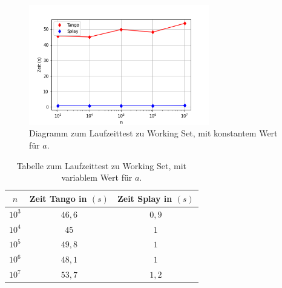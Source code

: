 \documentclass[a4paper,12pt]{article}
\begin{document}
\begin{figure}[H]
	\centering
	\includegraphics[width=0.7\textwidth]{Medien/laufzeittest/diagramm/workingset}
	\caption{Diagramm zum Laufzeittest zu Working Set, mit konstantem Wert für $a$.}
\end{figure}
\begin{table}[H]
	\begin{center}
		\begin{tabular}[c]{|c|c|c|}
			\hline
			$n$ & Zeit Tango in $\left(s\right)$ &Zeit Splay in $\left(s\right)$ \\
			\hline
			$10^3$ & $46,6$ &$0,9$ \\
			\hline
			$10^4$  & $45$ &$1$  \\
			\hline
			$10^5$  & $49,8$ &$1$  \\
			\hline
			$10^6$  & $48,1$ &$1$  \\
			\hline
			$10^7$  & $53,7$ &$1,2$  \\
			\hline
		\end{tabular}
		\caption{Tabelle zum Laufzeittest zu Working Set, mit variablem Wert für $a$.} 
	\end{center}
\end{table}
\end{document}
